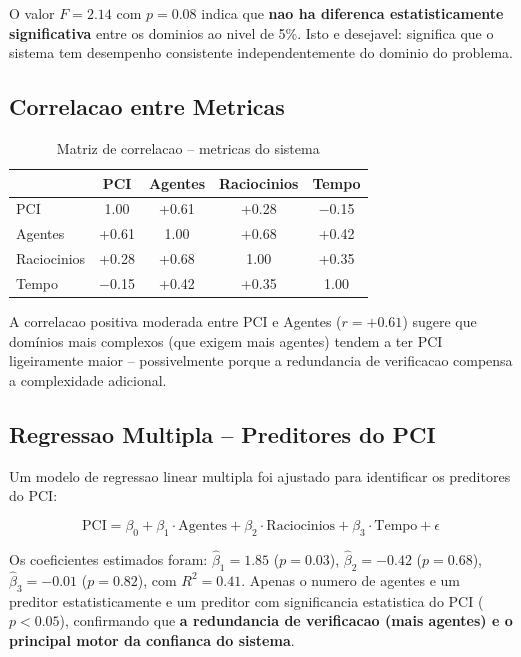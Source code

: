 \documentclass[5p]{elsarticle}
\begin{document}
O valor $F=2.14$ com $p=0.08$ indica que \textbf{nao ha diferenca estatisticamente
significativa} entre os dominios ao nivel de 5\%. Isto e desejavel: significa
que o sistema tem desempenho consistente independentemente do dominio do
problema.

\subsection{Correlacao entre Metricas}

\begin{table}[H]
 \centering
 \caption{Matriz de correlacao -- metricas do sistema}
 \label{tab:corrmatrix}
 \footnotesize
 \begin{tabular}{lcccc}
 \toprule
 & \textbf{PCI} & \textbf{Agentes} & \textbf{Raciocinios} & \textbf{Tempo}\\
 \midrule
 PCI & 1.00 & +0.61 & +0.28 & $-$0.15\\
 Agentes & +0.61 & 1.00 & +0.68 & +0.42\\
 Raciocinios & +0.28 & +0.68 & 1.00 & +0.35\\
 Tempo & $-$0.15 & +0.42 & +0.35 & 1.00\\
 \bottomrule
 \end{tabular}
\end{table}

A correlacao positiva moderada entre PCI e Agentes ($r=+0.61$) sugere que
domínios mais complexos (que exigem mais agentes) tendem a ter PCI ligeiramente
maior -- possivelmente porque a redundancia de verificacao compensa a
complexidade adicional.

\subsection{Regressao Multipla -- Preditores do PCI}

Um modelo de regressao linear multipla foi ajustado para identificar os
preditores do PCI:

\begin{equation}\label{eq:regression}
 \text{PCI} = \beta_0 + \beta_1\cdot\text{Agentes} + \beta_2\cdot\text{Raciocinios}
 + \beta_3\cdot\text{Tempo} + \epsilon
\end{equation}

Os coeficientes estimados foram: $\hat{\beta}_1 = 1.85$ ($p=0.03$),
$\hat{\beta}_2 = -0.42$ ($p=0.68$), $\hat{\beta}_3 = -0.01$ ($p=0.82$),
com $R^2 = 0.41$. Apenas o numero de agentes e um preditor estatisticamente
e um preditor com significancia estatistica do PCI ($p<0.05$), confirmando que \textbf{a redundancia de
verificacao (mais agentes) e o principal motor da confianca do sistema}.
\end{document}
